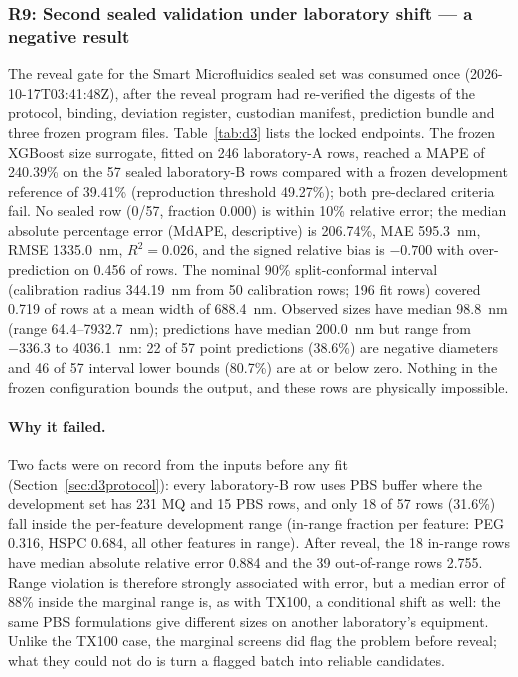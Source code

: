 \documentclass[11pt,a4paper]{article}
\newcommand{\tox}{TX100}
\begin{document}
\subsubsection{R9: Second sealed validation under laboratory shift --- a negative result}
\label{sec:r9}
The reveal gate for the Smart Microfluidics sealed set was consumed once
(2026-10-17T03:41:48Z), after the reveal program had re-verified the digests
of the protocol, binding, deviation register, custodian manifest, prediction
bundle and three frozen program files. Table~\ref{tab:d3} lists the locked
endpoints. The frozen XGBoost size surrogate, fitted on 246 laboratory-A
rows, reached a MAPE of 240.39\% on the 57 sealed laboratory-B rows compared with a frozen development reference of 39.41\% (reproduction threshold 49.27\%);
both pre-declared criteria fail. No sealed row (0/57, fraction 0.000) is
within 10\% relative error; the median absolute percentage error (MdAPE,
descriptive) is 206.74\%, MAE 595.3~nm, RMSE 1335.0~nm, $R^2=0.026$, and the
signed relative bias is $-0.700$ with over-prediction on 0.456 of rows. The nominal 90\% split-conformal interval
(calibration radius 344.19~nm from 50 calibration rows; 196 fit rows) covered
0.719 of rows at a mean width of 688.4~nm. Observed sizes have median
98.8~nm (range 64.4--7932.7~nm); predictions have median 200.0~nm but range
from $-336.3$ to 4036.1~nm: 22 of 57 point predictions (38.6\%) are negative
diameters and 46 of 57 interval lower bounds (80.7\%) are at or below zero.
Nothing in the frozen configuration bounds the output, and these rows are
physically impossible.

\paragraph{Why it failed.} Two facts were on record from the inputs before
any fit (Section~\ref{sec:d3protocol}): every laboratory-B row uses PBS
buffer where the development set has 231 MQ and 15 PBS rows, and only 18 of
57 rows (31.6\%) fall inside the per-feature development range (in-range fraction
per feature: PEG 0.316, HSPC 0.684, all other features in range). After reveal, the 18 in-range rows have median
absolute relative error 0.884 and the 39 out-of-range rows 2.755. Range
violation is therefore strongly associated with error, but a median error of
88\% inside the marginal range is, as with \tox{}, a conditional shift as
well: the same PBS formulations give different sizes on another laboratory's
equipment. Unlike the \tox{} case, the marginal screens did flag the problem
before reveal; what they could not do is turn a flagged batch into reliable
candidates.
\end{document}
